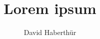 \documentclass{scrartcl}
\title{Lorem ipsum}
\author{David Haberth\"ur}
\begin{document}
\maketitle
\lipsum
\end{document}
